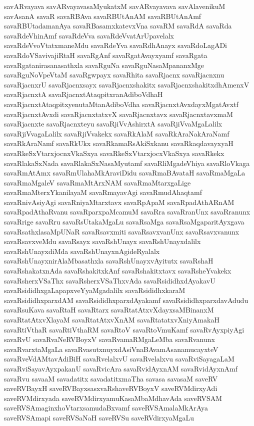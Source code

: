 {savARvayava
savARvayavasaMyukatxM
savARvayavava
savAlavenikuM
savAsanA
savaR
savaRBAva
savaRBUtAnAM
savaRBUtAnAmf
savaRBUtadamanAya
savaRBasamxkatevxVna
savaRM
savaRdA
savaRda
savaRdeVhinAmf
savaRdeVva
savaRdeVvatArUpavelalx
savaRdeVvoVtatxmaneMdu
savaRdeYva
savaRdhAnayx
savaRdoLagADi
savaRdoVSavivajiRtaH
savaRgAnf
savaRgatAvayxyamf
savaRgata
savaRgatanirasanasathxla
savaRguNa
savaRguNasaMpananxMge
savaRguNoVpeVtaM
savaRgwpayx
savaRhita
savaRjacnx
savaRjacnxnu
savaRjacnxrU
savaRjacnxsayx
savaRjacnxshakitx
savaRjacnxshakitxdhAmenxV
savaRjacnxtA
savaRjacnxtAtaqpitxranAdiboVdhaH
savaRjacnxtAtaqpitxyenutaMtanAdiboVdha
savaRjacnxtAvxdayxMgatAvxtf
savaRjacnxtAvxdi
savaRjacnxtatxvX
savaRjacnxtavx
savaRjacnxtavxmaM
savaRjacnxte
savaRjacnxteyu
savaRjiVvAshirxtA
savaRjiVvaMgaLalilx
savaRjiVvagaLalilx
savaRjiVvakekx
savaRkAlaM
savaRkAraNakAraNamf
savaRkAraNamf
savaRkUkx
savaRkamaRsAkiSxkanu
savaRkaqdavayxyaH
savaRkeSxVtarxjocnxVkaSxya
savaRkeSxVtarxjocxVkaSxya
savaRkekx
savaRlakaSxNada
savaRlakaSxNasaMyutamf
savaRliMgadeVhiya
savaRloVkaga
savaRmAtAmx
savaRmUlahaMkAraviDidu
savaRmaBAvataH
savaRmaMgaLa
savaRmaMgaleV
savaRmaMtArxNAM
savaRmaMtarxgaLige
savaRmaMterxYkanilayaM
savaRmayavAgi
savaRmudAhaqtamf
savaRnivAsiyAgi
savaRniyaMtarxtavx
savaRpApaM
savaRpadAthARnAM
savaRpadAthaRvanu
savaRparxpaMcamuM
savaRra
savaRranUnx
savaRranunx
savaRrige
savaRru
savaRsUtakaMgaLu
savaRsaMga
savaRsaMgaparitAyxgava
savaRsathxlasaMpUNaR
savaRsavxmiti
savaRsavxvanUnx
savaRsavxvanunx
savaRsavxveMdu
savaRsayx
savaRshUnayx
savaRshUnayxdalilx
savaRshUnayxdiMda
savaRshUnayxnAgideRyalalx
savaRshUnayxnirAlaMbasathxla
savaRshUnayxvAyitutx
savaRshaH
savaRshakatxnAda
savaRshakitxkAnf
savaRshakitxtavx
savaRsheYvakekx
savaRsherxVSaThx
savaRsherxVSaThxvAda
savaRsididhxdAyakavU
savaRsididhxgaLapapxveYyaMgadalilx
savaRsididhxkaraM
savaRsididhxparxdAM
savaRsididhxparxdAyakamf
savaRsididhxparxdavAdudu
savaRsuKava
savaRtaH
savaRtarx
savaRtatAtxvXdayxsaMBinanxM
savaRtatAtxvXlayaM
savaRtatAtxvXnAM
savaRtatatxvXniyAmakaH
savaRtiVthaR
savaRtiVthaRM
savaRtoV
savaRtoVmuKamf
savaRvAyxpiyAgi
savaRvU
savaRvaNeRVBoyxV
savaRvamaRMgaLeMba
savaRvanunx
savaRvarxtaMgaLa
savaRvasutxnuyxdAsiVnaBAvamAsanamucayxteV
savaRveVdAMtavAdiBiH
savaRvelalxvU
savaRvelalxvu
savaRviSayagaLaM
savaRviSayavAyxpakanU
savaRvicAra
savaRvidAyxnAM
savaRvidAyxnAmf
savaRvu
savaaM
savadatitx
savadatitxmaTha
savasa
savasaM
saveRV
saveRVBayxH
saveRVBayxsasxvaRshaveRVBoyxV
saveRVMdirxyAdi
saveRVMdirxyada
saveRVMdirxyamuKasaMbaMdhavAda
saveRVSAM
saveRVSAmaginxhoVtarxsamudaBxvamf
saveRVSAmalaMkArAya
saveRVSAmapi
saveRVSaNaH
saveRVSu
saveRVdirxyaMgaLu
}
